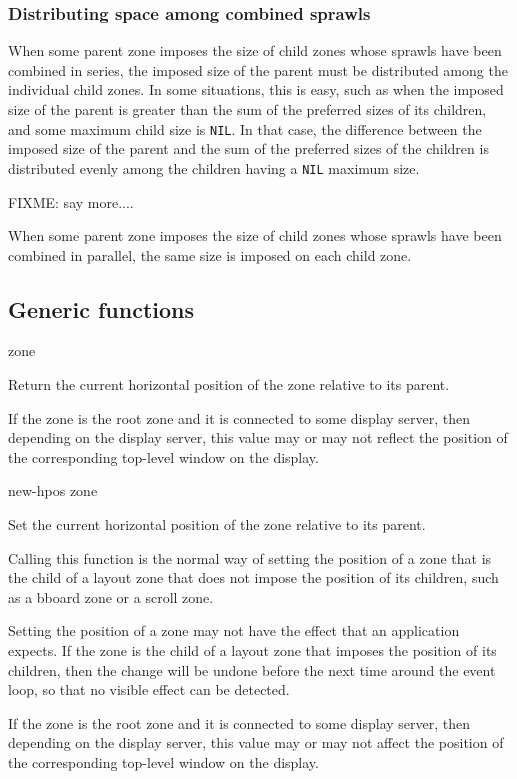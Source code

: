 \subsubsection{Distributing space among combined sprawls}

When some parent zone imposes the size of child zones whose sprawls
have been combined in series, the imposed size of the parent must be
distributed among the individual child zones.  In some situations,
this is easy, such as when the imposed size of the parent is greater
than the sum of the preferred sizes of its children, and some maximum
child size is \texttt{NIL}.  In that case, the difference between the
imposed size of the parent and the sum of the preferred sizes of the
children is distributed evenly among the children having a
\texttt{NIL} maximum size.

FIXME: say more....

When some parent zone imposes the size of child zones whose sprawls
have been combined in parallel, the same size is imposed on each child
zone.

\subsection{Generic functions}

 {zone}

Return the current horizontal position of the zone relative to its
parent.  

If the zone is the root zone and it is connected to some display
server, then depending on the display server, this value may or
may not reflect the position of the corresponding top-level
window on the display. 

 {new-hpos zone}

Set the current horizontal position of the zone relative to its
parent.  

Calling this function is the normal way of setting the position of
a zone that is the child of a layout zone that does not impose the
position of its children, such as a bboard zone or a scroll
zone.

Setting the position of a zone may not have the effect that an
application expects.  If the zone is the child of a layout zone
that imposes the position of its children, then the change will be
undone before the next time around the event loop, so that no
visible effect can be detected.  

If the zone is the root zone and it is connected to some display
server, then depending on the display server, this value may or
may not affect the position of the corresponding top-level window
on the display.

